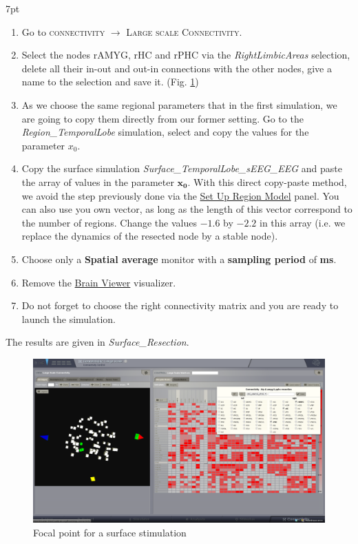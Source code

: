 \documentclass{tufte-handout}
\newenvironment{simulation}{%
  \def\FrameCommand{%
    \hspace{1pt}%
    {\color{ForestGreen}\vrule width 2pt}%
    {\color{simulationshade}\vrule width 4pt}%
    \colorbox{simulationshade}%
  }%
  \MakeFramed{\advance\hsize-\width\FrameRestore}%
  \noindent\hspace{-4.55pt}%
  \begin{adjustwidth}{}{7pt}%
  \vspace{2pt}\vspace{2pt}%
}
{%
  \vspace{2pt}\end{adjustwidth}\endMakeFramed%
}
\begin{document}
\begin{simulation}
  \begin{enumerate}
  \item Go to \textsc{connectivity} $\rightarrow$ \textsc{Large scale Connectivity}.
  \item Select the nodes rAMYG, rHC and rPHC via the \textit{RightLimbicAreas} selection, delete all their in-out and out-in connections
  with the other nodes, give a name to the selection and save it. (Fig. \ref{fig:resec})
  \item As we choose the same regional parameters that in the first simulation, we are going to copy them directly from our
  former setting. Go to the \textit{Region\_TemporalLobe} simulation, select and copy the values for the parameter  $x_0$. 
  \item Copy the surface simulation \textit{Surface\_TemporalLobe\_sEEG\_EEG} and paste the array of values in the parameter $\mathbf{x_0}$.
  With this direct copy-paste method, we avoid the step previously done via the \underline{Set Up Region Model} panel.
  You can also use you own vector, as long as the length of this vector correspond to the number of regions.
  Change the values $\mathbf{-1.6}$ by $\mathbf{-2.2}$ in this array (i.e. we replace the dynamics of the resected node by a stable node).
  \item Choose only a \textbf{Spatial average} monitor with a \textbf{sampling period} of \textbf{\unit[1]{ms}}.
  \item Remove the \underline{Brain Viewer} visualizer.
  \item Do not forget to choose the right connectivity matrix and you are ready to launch the simulation.
  \end{enumerate}
\end{simulation}

The results are given in \textit{Surface\_Resection}.

\begin{figure}[h]
  \includegraphics[width=\linewidth]{Handout_UI_ModellingAnEpilepticPatient_ConnectivityMatrixResection}%
  \caption{Focal point for a surface stimulation}%
  \label{fig:resec}%
\end{figure}
\end{document}
